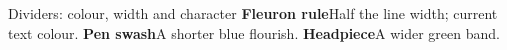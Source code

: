 \documentclass[aspectratio=169]{beamer}
\begin{document}
\begin{frame}{Dividers: colour, width and character}
  {\small\textbf{Fleuron rule}\quad Half the line width; current text colour.}
  \floraldivider
  {\small\textbf{Pen swash}\quad A shorter blue flourish.}
  \floraldivider
  {\small\textbf{Headpiece}\quad A wider green band.}
  \floraldivider
\end{frame}
\end{document}
